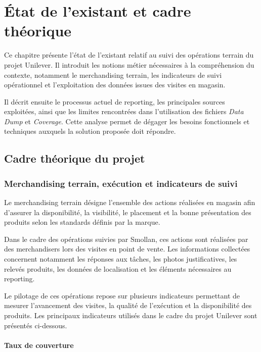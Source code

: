 \chapter{État de l’existant et cadre théorique}

Ce chapitre présente l’état de l’existant relatif au suivi des opérations terrain du projet Unilever. Il introduit les notions métier nécessaires à la compréhension du contexte, notamment le merchandising terrain, les indicateurs de suivi opérationnel et l’exploitation des données issues des visites en magasin.

Il décrit ensuite le processus actuel de reporting, les principales sources exploitées, ainsi que les limites rencontrées dans l’utilisation des fichiers \textit{Data Dump} et \textit{Coverage}. Cette analyse permet de dégager les besoins fonctionnels et techniques auxquels la solution proposée doit répondre.

\section{Cadre théorique du projet}

\subsection{Merchandising terrain, exécution et indicateurs de suivi}

Le merchandising terrain désigne l’ensemble des actions réalisées en magasin afin d’assurer la disponibilité, la visibilité, le placement et la bonne présentation des produits selon les standards définis par la marque.

Dans le cadre des opérations suivies par Smollan, ces actions sont réalisées par des merchandisers lors des visites en point de vente. Les informations collectées concernent notamment les réponses aux tâches, les photos justificatives, les relevés produits, les données de localisation et les éléments nécessaires au reporting.

Le pilotage de ces opérations repose sur plusieurs indicateurs permettant de mesurer l’avancement des visites, la qualité de l’exécution et la disponibilité des produits. Les principaux indicateurs utilisés dans le cadre du projet Unilever sont présentés ci-dessous.

\subsubsection{Taux de couverture}

